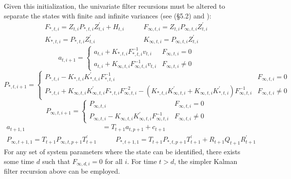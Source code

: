 \documentclass[12pt]{article}
\begin{document}
	Given this initialization, the univariate filter recursions must be altered to separate the states with finite and infinite variances (see \cite{dk_book} (\S 5.2) and \cite{dk_fast}): 
	\begin{align*}
	 F_{*,t,i} = Z_{t,i} P_{*,t,i} Z_{t,i}^\prime + H_{t,i} &\qquad F_{\infty,t,i} = Z_{t,i} P_{\infty,t,i} Z_{t,i}^\prime\\
	K_{*,t,i} = P_{*,t,i} Z_{t,i}^\prime &\qquad K_{\infty,t,i} = P_{\infty,t,i} Z_{t,i}^\prime
	\end{align*}
	\begin{equation*}
	a_{t,i+1} = \begin{cases} 
	      a_{t,i} + K_{*,t,i} F_{*,t,i}^{-1} v_{t,i} & F_{\infty,t,i} = 0 \\
	      a_{t,i} + K_{\infty,t,i} F_{\infty,t,i}^{-1} v_{t,i} & F_{\infty,t,i} \neq 0
    \end{cases} 
    \end{equation*}
	\begin{equation*}
	P_{*,t,i+1} = \begin{cases} 
	   P_{*,t,i} - K_{*,t,i} K_{*,t,i}^\prime F_{*,t,i}^{-1} & F_{\infty,t,i} = 0 \\
	   P_{*,t,i} + K_{\infty,t,i} K_{\infty,t,i}^\prime F_{*,t,i} F_{\infty,t,i}^{-2} - (K_{*,t,i} K_{\infty,t,i}^\prime + K_{\infty,t,i} K_{*,t,i}^\prime) F_{\infty,t,i}^{-1} & F_{\infty,t,i} \neq 0
	\end{cases}
	\end{equation*}
	\begin{equation*}
	P_{\infty,t,i+1} = \begin{cases} 
	   P_{\infty,t,i} & F_{\infty,t,i} = 0 \\
	   P_{\infty,t,i} - K_{\infty,t,i} K_{\infty,t,i}^\prime F_{\infty,t,i}^{-1} & F_{\infty,t,i} \neq 0	   
	\end{cases} 
	\end{equation*}
	\begin{align*}
	a_{t+1,1} &= T_{t+1} a_{t, p+1} + c_{t+1} \\
	P_{\infty,t+1,1} = T_{t+1} P_{\infty,t,p+1} T_{t+1}^\prime &\qquad P_{*,t+1,1} = T_{t+1} P_{*,t,p+1} T_{t+1}^\prime + R_{t+1} Q_{t+1} R_{t+1}^\prime 
	\end{align*}
	For any set of system parameters where the state can be identified, there exists some time $d$ such that $F_{\infty,d,i} = 0$ for all $i$. For time $t > d$, the simpler Kalman filter recursion above can be employed. 
\end{document}

